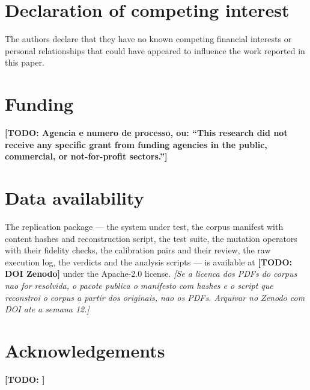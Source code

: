 \documentclass[a4paper,fleqn]{cas-dc}
\newcommand{\todo}[1]{{\color{red}\bfseries [TODO: #1]}}
\newcommand{\nota}[1]{{\color{blue}\itshape [#1]}}
\begin{document}
\printcredits

\section*{Declaration of competing interest}

The authors declare that they have no known competing financial interests or
personal relationships that could have appeared to influence the work reported
in this paper.

\section*{Funding}

\todo{Agencia e numero de processo, ou: ``This research did not receive any
specific grant from funding agencies in the public, commercial, or
not-for-profit sectors.''}

\section*{Data availability}

The replication package --- the system under test, the corpus manifest with
content hashes and reconstruction script, the test suite, the mutation
operators with their fidelity checks, the calibration pairs and their review,
the raw execution log, the verdicts and the analysis scripts --- is available
at \todo{DOI Zenodo} under the Apache-2.0 license. \nota{Se a licenca dos
PDFs do corpus nao for resolvida, o pacote publica o manifesto com hashes e o
script que reconstroi o corpus a partir dos originais, nao os PDFs. Arquivar
no Zenodo com DOI ate a semana 12.}

\section*{Acknowledgements}

\todo{}



\end{document}
